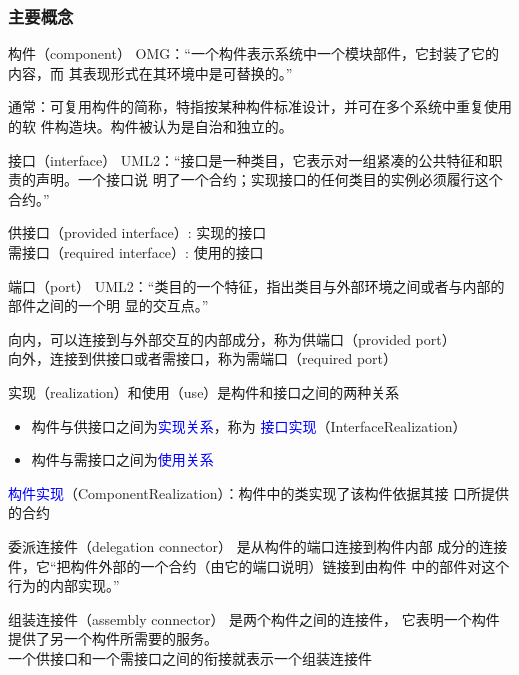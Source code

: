 \documentclass[compress]{beamer}
\begin{document}
\begin{frame}
  \frametitle{主要概念}
   {
  \begin{block}{构件（component）}
    OMG：“一个构件表示系统中一个模块部件，它封装了它的内容，而
    其表现形式在其环境中是\alert{可替换}的。”
  \end{block}

  通常：可复用构件的简称，特指按某种构件标准设计，并可在多个系统中重复使用的软
  件构造块。构件被认为是自治和独立的。
  }
  {
  \begin{block}{接口（interface）}
    UML2：“接口是一种类目，它表示对一组紧凑的公共特征和职责的声明。一个接口说
    明了一个合约；实现接口的任何类目的实例必须履行这个合约。” 
  \end{block}
  供接口（provided interface）: 实现的接口 \\
  需接口（required interface）: 使用的接口
  }
  {
  \begin{block}{端口（port）}
    UML2：“类目的一个特征，指出类目与外部环境之间或者与内部的部件之间的一个明
    显的交互点。” 
  \end{block}
    向内，可以连接到与外部交互的内部成分，称为供端口（provided port） \\
    向外，连接到供接口或者需接口，称为需端口（required port）
  }
   {
        实现（realization）和使用（use）是构件和接口之间的两种关系 
        \begin{itemize}
          \item 构件与供接口之间为\textcolor{blue}{实现关系}，称为
        \textcolor{blue}{接口实现}（InterfaceRealization）
      \item 构件与需接口之间为\textcolor{blue}{使用关系} 
    \end{itemize}

        \textcolor{blue}{构件实现}（ComponentRealization）：构件中的类实现了该构件依据其接
        口所提供的合约
  }
   {
    \begin{block}{委派连接件（delegation connector）}
      是从构件的端口连接到构件内部
    成分的连接件，它“把构件外部的一个合约（由它的端口说明）链接到由构件
    中的部件对这个行为的内部实现。”  
  \end{block}
  \begin{block}{组装连接件（assembly connector）}
    是两个构件之间的连接件，
      它表明一个构件提供了另一个构件所需要的服务。 \\
      一个供接口和一个需接口之间的衔接就表示一个组装连接件
    \end{block}
  }
\end{frame}
\end{document}
